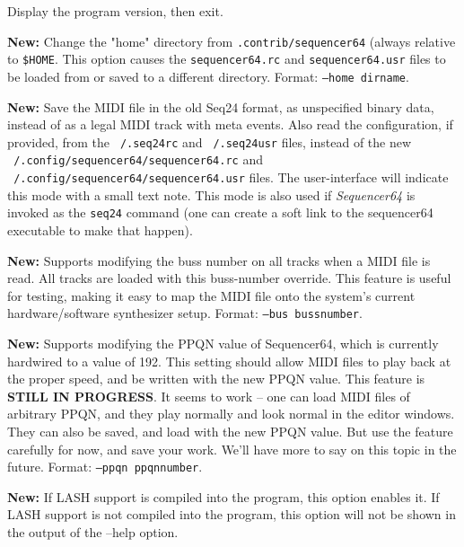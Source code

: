       Display the program version, then exit.

      \textbf{New:}
      Change the "home" directory from \texttt{.contrib/sequencer64}
      (always relative to \texttt{\$HOME}.
      This option causes the \texttt{sequencer64.rc}
      and \texttt{sequencer64.usr} files to be loaded from or
      saved to a different directory.
      Format: \texttt{--home dirname}.

      \textbf{New:}
      Save the MIDI file in the old Seq24 format, as unspecified
      binary data, instead of as a legal MIDI track with meta events.
      Also read the configuration, if provided, from the
      \texttt{~/.seq24rc} and \texttt{~/.seq24usr} files,
      instead of the new
      \texttt{~/.config/sequencer64/sequencer64.rc} and
      \texttt{~/.config/sequencer64/sequencer64.usr} files.
      The user-interface will indicate this mode with a small text
      note.
      This mode is also used if \textsl{Sequencer64} is invoked as the
      \texttt{seq24} command (one can create a soft link to the sequencer64
      executable to make that happen).

      \textbf{New:}
      Supports modifying the buss number on all tracks when a MIDI file is
      read.  All tracks are loaded with this buss-number override.  This
      feature is useful for testing, making it easy to map the MIDI file onto
      the system's current hardware/software synthesizer setup.
      Format: \texttt{--bus bussnumber}.

      \textbf{New:}
      Supports modifying the PPQN value of Sequencer64, which is currently
      hardwired to a value of 192.  This setting should allow MIDI files to
      play back at the proper speed, and be written with the new PPQN value.
      This feature is \textbf{STILL IN PROGRESS}.
      It seems to work -- one can load MIDI files of arbitrary PPQN, and they
      play normally and look normal in the editor windows.  They can also be
      saved, and load with the new PPQN value. 
      But use the feature carefully for now, and save your work.
      We'll have more to say on this topic in the future.
      Format: \texttt{--ppqn ppqnnumber}.

      \textbf{New:}
      If LASH support is compiled into the program, this option
      enables it.
      If LASH support is not compiled into the program, this option will not
      be shown in the output of the --help option.

